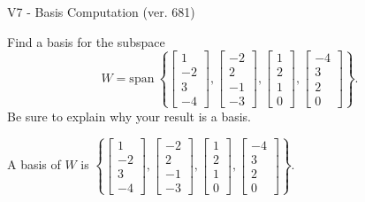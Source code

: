 \begin{exercise}
  \begin{exerciseTitle}V7 - Basis Computation (ver. 681)\end{exerciseTitle}
  \begin{exerciseStatement}
    Find a basis for the subspace 
\[W=\mathrm{span}\ \left\{\left[\begin{array}{r}
1 \\
-2 \\
3 \\
-4
\end{array}\right] , \left[\begin{array}{r}
-2 \\
2 \\
-1 \\
-3
\end{array}\right] , \left[\begin{array}{r}
1 \\
2 \\
1 \\
0
\end{array}\right] , \left[\begin{array}{r}
-4 \\
3 \\
2 \\
0
\end{array}\right]\right\}.\]
 Be sure to explain why your result is a basis.


  \end{exerciseStatement}
  \begin{exerciseAnswer}
   A basis of \(W\) is  \(\left\{\left[\begin{array}{r}
1 \\
-2 \\
3 \\
-4
\end{array}\right] , \left[\begin{array}{r}
-2 \\
2 \\
-1 \\
-3
\end{array}\right] , \left[\begin{array}{r}
1 \\
2 \\
1 \\
0
\end{array}\right] , \left[\begin{array}{r}
-4 \\
3 \\
2 \\
0
\end{array}\right]\right\}\).
  


  \end{exerciseAnswer}
\end{exercise}